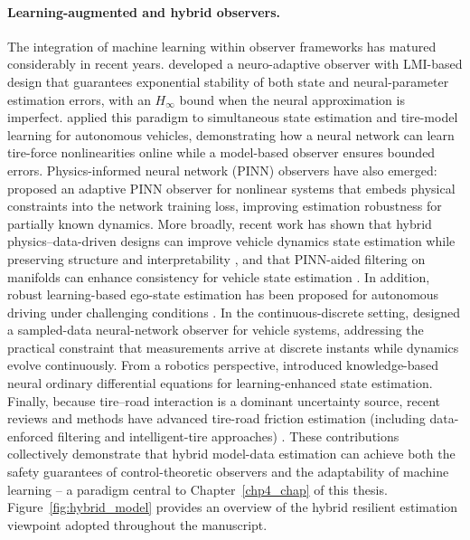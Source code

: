 \paragraph{Learning-augmented and hybrid observers.}
The integration of machine learning within observer frameworks has matured considerably in recent years.
\cite{JeongNeural} developed a neuro-adaptive observer with LMI-based design that guarantees exponential stability of both state and neural-parameter estimation errors, with an $H_\infty$ bound when the neural approximation is imperfect.
\cite{jeon2020simultaneous} applied this paradigm to simultaneous state estimation and tire-model learning for autonomous vehicles, demonstrating how a neural network can learn tire-force nonlinearities online while a model-based observer ensures bounded errors.
Physics-informed neural network (PINN) observers have also emerged: \cite{Farkane_2025} proposed an adaptive PINN observer for nonlinear systems that embeds physical constraints into the network training loss, improving estimation robustness for partially known dynamics.
More broadly, recent work has shown that hybrid physics--data-driven designs can improve vehicle dynamics state estimation while preserving structure and interpretability \cite{Li2025HybridPhysicsDataVehicleSE}, and that PINN-aided filtering on manifolds can enhance consistency for vehicle state estimation \cite{Tan2023PINNUKFManifolds}.
In addition, robust learning-based ego-state estimation has been proposed for autonomous driving under challenging conditions \cite{Dahal2024RobustStateNet}.
In the continuous-discrete setting, \cite{GHANI20235685} designed a sampled-data neural-network observer for vehicle systems, addressing the practical constraint that measurements arrive at discrete instants while dynamics evolve continuously.
From a robotics perspective, \cite{state_estKNOD} introduced knowledge-based neural ordinary differential equations for learning-enhanced state estimation.
Finally, because tire--road interaction is a dominant uncertainty source, recent reviews and methods have advanced tire-road friction estimation (including data-enforced filtering and intelligent-tire approaches) \cite{Wang2022TRFCReview,Han2025DataEnforcedUKFTRFC,Gu2025IntelligentTireTRFC}.
These contributions collectively demonstrate that hybrid model-data estimation can achieve both the safety guarantees of control-theoretic observers and the adaptability of machine learning -- a paradigm central to Chapter~\ref{chp4_chap} of this thesis.
Figure~\ref{fig:hybrid_model} provides an overview of the hybrid resilient estimation viewpoint adopted throughout the manuscript.

